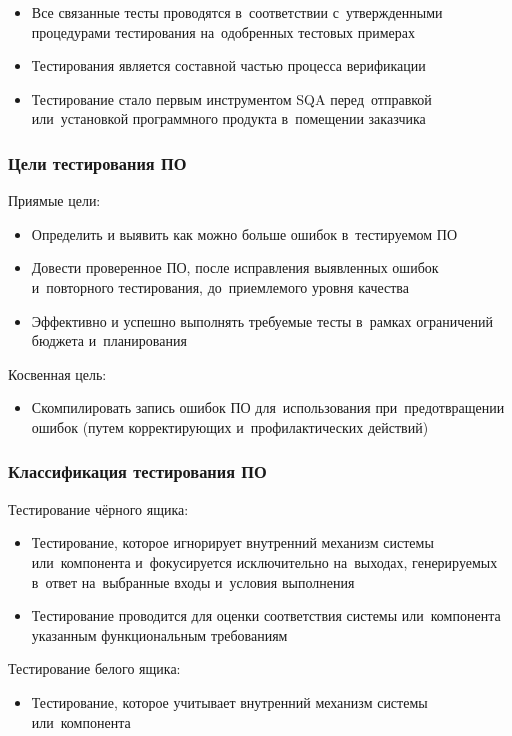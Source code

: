 \documentclass{../industrial-development}
\begin{document}
\lecturenotes

 	 \begin{itemize}
\item Все связанные тесты проводятся в~соответствии с~утвержденными процедурами тестирования на~одобренных тестовых примерах
\item Тестирования является составной частью процесса верификации
\item Тестирование стало первым инструментом SQA перед~отправкой или~установкой программного продукта в~помещении заказчика
  	\end{itemize}


\begin{frame} \frametitle{Цели тестирования ПО}
Приямые цели:
 	 \begin{itemize}
\item Определить и выявить как можно больше ошибок в~тестируемом ПО
\item Довести проверенное ПО, после исправления выявленных ошибок и~повторного тестирования, до~приемлемого уровня качества
\item Эффективно и успешно выполнять требуемые тесты в~рамках ограничений бюджета и~планирования
  	\end{itemize}
Косвенная цель:
 	 \begin{itemize}
\item Скомпилировать запись ошибок ПО для~использования при~предотвращении ошибок (путем корректирующих и~профилактических действий)
  	\end{itemize}
\end{frame}
 


\begin{frame} \frametitle{Классификация тестирования ПО}
Тестирование чёрного ящика:
 	 \begin{itemize}
\item Тестирование, которое игнорирует внутренний механизм системы или~компонента и~фокусируется исключительно на~выходах, генерируемых в~ответ на~выбранные входы и~условия выполнения
\item Тестирование проводится для оценки соответствия системы или~компонента указанным функциональным требованиям
  	\end{itemize}
Тестирование белого ящика:
 	 \begin{itemize}
\item Тестирование, которое учитывает внутренний механизм системы или~компонента
  	\end{itemize}
\end{frame}
 
\end{document}

